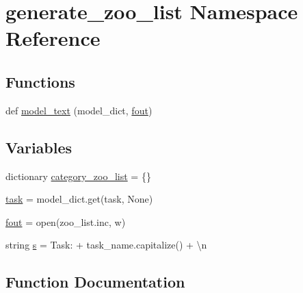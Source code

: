 \hypertarget{namespacegenerate__zoo__list}{}\section{generate\+\_\+zoo\+\_\+list Namespace Reference}
\label{namespacegenerate__zoo__list}
\subsection*{Functions}
\begin{DoxyCompactItemize}
\item 
def \hyperlink{namespacegenerate__zoo__list_a453b31f7a899a2ab380b3c1d84ad9b89}{model\+\_\+text} (model\+\_\+dict, \hyperlink{namespacegenerate__zoo__list_a856ce3399906c5da79bdf26a784249ae}{fout})
\end{DoxyCompactItemize}
\subsection*{Variables}
\begin{DoxyCompactItemize}
\item 
dictionary \hyperlink{namespacegenerate__zoo__list_a5fcda76c48a176fc2daa0d12a9602f49}{category\+\_\+zoo\+\_\+list} = \{\}
\item 
\hyperlink{namespacegenerate__zoo__list_ad3dbd35f1d59cff673fdcbc18b300da2}{task} = model\+\_\+dict.\+get(\textquotesingle{}task\textquotesingle{}, None)
\item 
\hyperlink{namespacegenerate__zoo__list_a856ce3399906c5da79bdf26a784249ae}{fout} = open(\textquotesingle{}zoo\+\_\+list.\+inc\textquotesingle{}, \textquotesingle{}w\textquotesingle{})
\item 
string \hyperlink{namespacegenerate__zoo__list_ab242661624dc2add618658bc9873f621}{s} = \textquotesingle{}Task\+: \textquotesingle{} + task\+\_\+name.\+capitalize() + \textquotesingle{}\textbackslash{}n\textquotesingle{}
\end{DoxyCompactItemize}


\subsection{Function Documentation}
\mbox{\label{namespacegenerate__zoo__list_a453b31f7a899a2ab380b3c1d84ad9b89}} 
